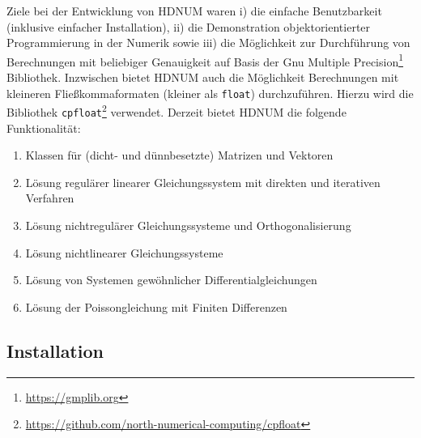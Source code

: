 \documentclass[a4paper,11pt]{article}
\theoremstyle{definition}
\begin{document}
Ziele bei der Entwicklung von HDNUM waren i) die einfache Benutzbarkeit (inklusive einfacher
Installation),
ii) die Demonstration objektorientierter Programmierung in der Numerik sowie iii) die
Möglichkeit zur Durchführung von Berechnungen mit beliebiger Genauigkeit auf Basis
der Gnu Multiple Precision\footnote{\url{https://gmplib.org}} Bibliothek.
Inzwischen bietet HDNUM auch die Möglichkeit Berechnungen mit kleineren Fließkommaformaten (kleiner als \lstinline{float})
durchzuführen. Hierzu wird die Bibliothek \lstinline{cpfloat}\footnote{\url{https://github.com/north-numerical-computing/cpfloat}} verwendet.
Derzeit bietet HDNUM die folgende Funktionalität:
\begin{enumerate}[1)]
\item Klassen für (dicht- und dünnbesetzte) Matrizen und Vektoren
\item Lösung regulärer linearer Gleichungssystem mit direkten und iterativen Verfahren
\item Lösung nichtregulärer Gleichungssysteme und Orthogonalisierung
\item Lösung nichtlinearer Gleichungssysteme
\item Lösung von Systemen gewöhnlicher Differentialgleichungen
\item Lösung der Poissongleichung mit Finiten Differenzen
\end{enumerate}

\subsection{Installation}
\end{document}

